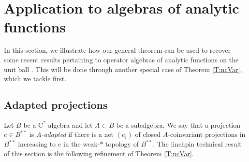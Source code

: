 \documentclass[10pt]{amsart}
\newcommand{\rC}{\mathrm{C}}
\theoremstyle{definition}
\begin{document}
 
 





\section{Application to algebras of analytic functions}\label{S:A(H)}
In this section, we illustrate how our general theorem can be used to recover some recent results pertaining to operator algebras of analytic functions on the unit ball \cite{DH2023}. This will be done through another special case of Theorem \ref{T:ncVar}, which we tackle first.

\subsection{Adapted projections}
Let $B$ be a $\rC^*$-algebra and let $A\subset B$ be a subalgebra. We say that a projection $e\in B^{**}$ is \emph{$A$-adapted} if there is a net $(e_i)$ of closed $A$-coinvariant 
 projections in $B^{**}$ increasing to $e$ in the weak-$*$ topology of $B^{**}$. The linchpin technical result of this section is the following refinement of Theorem \ref{T:ncVar}.
\end{document}

